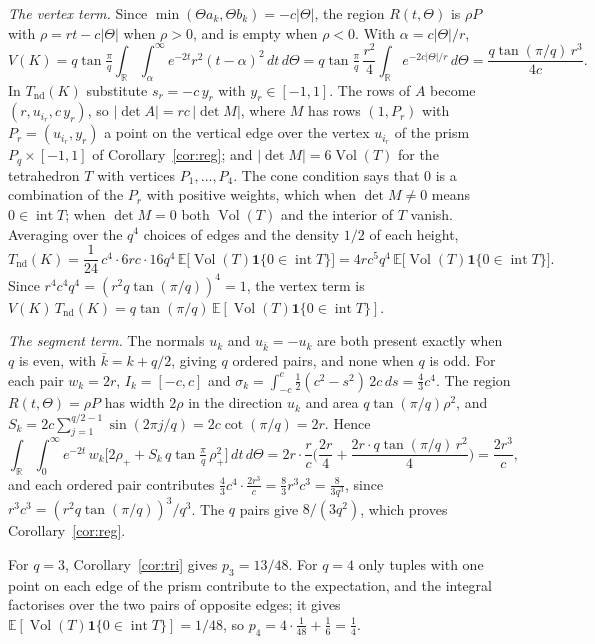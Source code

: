 \documentclass[11pt]{amsart}
\theoremstyle{remark}\newtheorem{remark}[theorem]{Remark}
\newcommand{\R}{\mathbb{R}}
\newcommand{\E}{\mathbb{E}}
\DeclareMathOperator{\Vol}{Vol}
\begin{document}
\emph{The vertex term.} Since $\min(\Theta a_k,\Theta b_k)=-c|\Theta|$, the region $R(t,\Theta)$ is $\rho P$ with
$\rho=rt-c|\Theta|$ when $\rho>0$, and is empty when $\rho<0$. With $\alpha=c|\Theta|/r$,
\[
V(K)=q\tan\tfrac{\pi}{q}\int_\R\int_\alpha^\infty e^{-2t}r^2(t-\alpha)^2\,dt\,d\Theta
=q\tan\tfrac{\pi}{q}\,\frac{r^2}{4}\int_\R e^{-2c|\Theta|/r}\,d\Theta=\frac{q\tan(\pi/q)\,r^3}{4c}.
\]
In $T_{\mathrm{nd}}(K)$ substitute $s_r=-c\,y_r$ with $y_r\in[-1,1]$. The rows of $A$ become $(r,u_{i_r},c\,y_r)$, so
$|\det A|=rc\,|\det M|$, where $M$ has rows $(1,P_r)$ with $P_r=(u_{i_r},y_r)$ a point on the vertical edge over the
vertex $u_{i_r}$ of the prism $P_q\times[-1,1]$ of Corollary~\ref{cor:reg}; and $|\det M|=6\Vol(T)$ for the tetrahedron
$T$ with vertices $P_1,\dots,P_4$. The cone condition says that $0$ is a combination of the $P_r$ with positive weights,
which when $\det M\ne0$ means $0\in\operatorname{int}T$; when $\det M=0$ both $\Vol(T)$ and the interior of $T$
vanish. Averaging over the $q^4$ choices of edges and the density $1/2$ of each height,
\[
T_{\mathrm{nd}}(K)=\frac1{24}\,c^4\cdot6rc\cdot16q^4\,\E\big[\Vol(T)\mathbf 1\{0\in\operatorname{int}T\}\big]
=4rc^5q^4\,\E\big[\Vol(T)\mathbf 1\{0\in\operatorname{int}T\}\big].
\]
Since $r^4c^4q^4=(r^2q\tan(\pi/q))^4=1$, the vertex term is $V(K)\,T_{\mathrm{nd}}(K)=q\tan(\pi/q)\,
\E[\Vol(T)\mathbf 1\{0\in\operatorname{int}T\}]$.

\emph{The segment term.} The normals $u_k$ and $u_{\bar k}=-u_k$ are both present exactly when $q$ is even, with $\bar
k=k+q/2$, giving $q$ ordered pairs, and none when $q$ is odd. For each pair $w_k=2r$, $I_k=[-c,c]$ and
$\sigma_k=\int_{-c}^{c}\frac12(c^2-s^2)\,2c\,ds=\frac43c^4$. The region $R(t,\Theta)=\rho P$ has width $2\rho$ in the
direction $u_k$ and area $q\tan(\pi/q)\rho^2$, and
$S_k=2c\sum_{j=1}^{q/2-1}\sin(2\pi j/q)=2c\cot(\pi/q)=2r$. Hence
\[
\int_\R\int_0^\infty e^{-2t}\,w_k\big[2\rho_++S_k\,q\tan\tfrac\pi q\,\rho_+^2\big]\,dt\,d\Theta
=2r\cdot\frac rc\Big(\frac{2r}4+\frac{2r\cdot q\tan(\pi/q)\,r^2}{4}\Big)=\frac{2r^3}{c},
\]
and each ordered pair contributes $\frac43c^4\cdot\frac{2r^3}c=\frac83r^3c^3=\frac{8}{3q^3}$, since
$r^3c^3=(r^2q\tan(\pi/q))^3/q^3$. The $q$ pairs give $8/(3q^2)$, which proves Corollary~\ref{cor:reg}.

For $q=3$, Corollary~\ref{cor:tri} gives $p_3=13/48$. For $q=4$ only tuples with one point on each edge of the prism
contribute to the expectation, and the integral factorises over the two pairs of opposite edges; it gives
$\E[\Vol(T)\mathbf 1\{0\in\operatorname{int}T\}]=1/48$, so $p_4=4\cdot\frac1{48}+\frac16=\frac14$.
\end{document}
